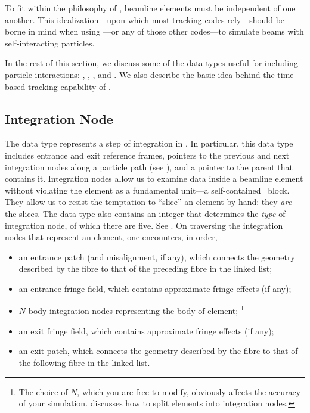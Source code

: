 To fit within the philosophy of \PTC, beamline elements must
be independent of one another. This idealization---upon which
most tracking codes rely---should be borne in mind when using
\PTC---or any of those other codes---to simulate beams with
self-interacting particles.%

In the rest of this section, we discuss some of the data
types useful for including particle interactions:
, , ,
and . We also describe the basic idea
behind the time-based tracking capability of \PTC.


\subsection{Integration Node}
\label{sec:integr.node}

%
The data type  represents a step of
integration in \PTC. In particular, this data type includes
entrance and exit reference frames, pointers to the previous
and next integration nodes along a particle path
(see ), and a pointer to the parent
 that contains it. Integration nodes allow us to
examine data inside a beamline element without violating the
element as a fundamental unit---a self-contained \LEGO\ block.
They allow us to resist the temptation to ``slice'' an element
by hand: they \emph{are} the slices. The data type
 also contains an integer that
determines the \emph{type} of integration node, of which there
are five. See . On traversing the integration
nodes that represent an element, one encounters, in order,
\begin{itemize}
  \item an entrance patch (and misalignment, if any), which
connects the geometry described by the fibre to that of the
preceding fibre in the linked list;
  \item an entrance fringe field, which contains approximate
fringe effects (if any);
  \item $N$ body integration nodes representing the body of element;%
\footnote{The choice of $N$, which you are free to modify,
obviously affects the accuracy of your simulation.
 discusses how to split elements into
integration nodes.}
  \item an exit fringe field, which contains approximate fringe
effects (if any);
  \item an exit patch, which connects the geometry described by
the fibre to that of the following fibre in the linked list.
\end{itemize}




